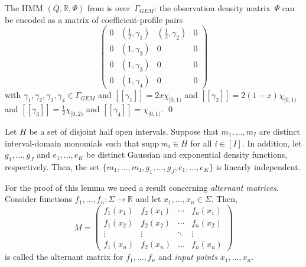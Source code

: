 \documentclass[a4paper,UKenglish,cleveref, autoref,mathscr]{lipics-v2019}
\newcommand{\RR}{\mathbb{R}}
\newcommand{\1}{\mathbbm{1}}
\newcommand{\supp}{\mathrm{supp}}
\newcommand{\pl}{\Gamma_{\mathit{GEM}}}
\begin{document}
\begin{example}\label{profileexample}
The HMM $(Q, \RR, \Psi)$ from  is over~$\pl$: the observation density matrix~$\Psi$ can be encoded as a matrix of coefficient-profile pairs
\[
\begin{pmatrix}
0 & (\frac12, \gamma_1)  & (\frac12,\gamma_2) & 0 \\
0 & (1,\gamma_3) & 0 & 0 \\
0 & (1,\gamma_3) & 0 & 0 \\
0 & (1,\gamma_4) & 0 & 0
\end{pmatrix}
\]
with $\gamma_1, \gamma_2, \gamma_3, \gamma_4 \in \pl$ and
$[\![\gamma_1]\!] = 2x\chi_{[0,1)}$ and
$[\![\gamma_2]\!] = 2(1-x)\chi_{[0,1)}$ and
$[\![\gamma_3]\!] = \frac12 \chi_{[0,2)}$ and
$[\![\gamma_4]\!] = \chi_{[0,1)}$.
\qed
\end{example}

\begin{lemma}\label{linindepofcommonfuncs}
Let $H$ be a set of disjoint half open intervals.
Suppose that $m_1, \dots, m_I$ are distinct interval-domain monomials such that $\supp~m_i \in H$ for all $i \in [I]$. In addition, let $g_1, \dots, g_J$ and $e_1, \dots, e_K$ be distinct Gaussian and exponential density functions, respectively. Then, the set $\{m_1, \dots, m_I, g_1, \dots, g_J, e_1, \dots, e_K\}$ is linearly independent.
\end{lemma}
For the proof of this lemma we need a result concerning \emph{alternant matrices}. Consider functions $f_1, \dots, f_n : \Sigma \rightarrow \RR$ and let $x_1, \dots, x_n \in \Sigma$. Then,
\[M = \begin{pmatrix}
f_1(x_1) &  f_2(x_1) &  \cdots  & f_n(x_1) \\
f_1(x_2) & f_2(x_2) & \cdots  & f_n(x_2) \\
\vdots & \vdots & \ddots & \vdots \\
f_1(x_n) & f_2(x_n) & \dots  & f_n(x_n)
\end{pmatrix}\]
is called the alternant matrix for $f_1, \dots, f_n$ and \emph{input points} $x_1, \dots, x_n$.
\end{document}
